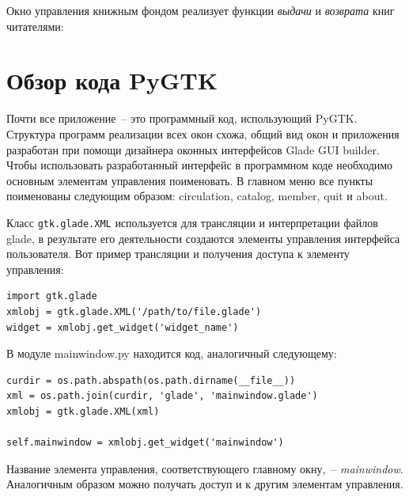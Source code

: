 \documentclass[a4paper,openany,twoside,final]{book}
\providecommand*{\DUroletitlereference}[1]{\textsl{#1}}
\begin{document}
Окно управления книжным фондом реализует функции \emph{выдачи} и \emph{возврата} книг читателями:

\noindent{}


\section{Обзор кода PyGTK%
  \label{pygtk}%
}

Почти все приложение~-- это программный код, использующий PyGTK. Структура программ реализации всех окон схожа, общий вид окон и приложения разработан при помощи дизайнера оконных интерфейсов Glade GUI builder.  Чтобы использовать разработанный интерфейс в программном коде необходимо основным элементам управления поименовать.  В главном меню все пункты поименованы следующим образом: \textquotedbl{}circulation\textquotedbl{}, \textquotedbl{}catalog\textquotedbl{}, \textquotedbl{}member\textquotedbl{}, \textquotedbl{}quit\textquotedbl{} и \textquotedbl{}about\textquotedbl{}.

Класс \texttt{gtk.glade.XML} используется для трансляции и интерпретации файлов glade, в результате его деятельности создаются элементы управления интерфейса пользователя.  Вот пример трансляции и получения доступа к элементу управления:

\begin{verbatim}
import gtk.glade
xmlobj = gtk.glade.XML('/path/to/file.glade')
widget = xmlobj.get_widget('widget_name')
\end{verbatim}

В модуле mainwindow.py находится код, аналогичный следующему:

\begin{verbatim}
curdir = os.path.abspath(os.path.dirname(__file__))
xml = os.path.join(curdir, 'glade', 'mainwindow.glade')
xmlobj = gtk.glade.XML(xml)

self.mainwindow = xmlobj.get_widget('mainwindow')
\end{verbatim}

Название элемента управления, соответствующего главному окну,~-- \DUroletitlereference{mainwindow}.  Аналогичным образом можно получать доступ и к другим элементам управления.
\end{document}
